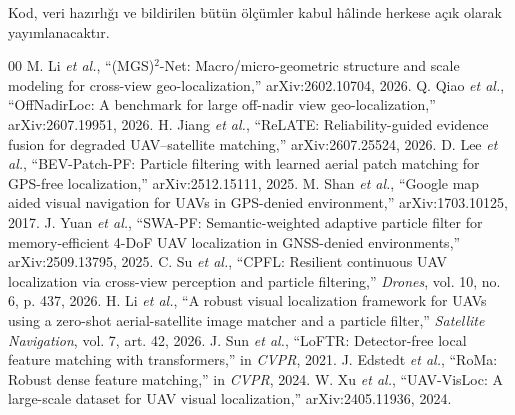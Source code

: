 \documentclass[conference]{IEEEtran}
\begin{document}
Kod, veri hazırlığı ve bildirilen bütün ölçümler kabul hâlinde herkese açık
olarak yayımlanacaktır.

\begin{thebibliography}{00}
 M. Li \textit{et al.}, ``(MGS)$^2$-Net: Macro/micro-geometric
structure and scale modeling for cross-view geo-localization,''
arXiv:2602.10704, 2026.
 Q. Qiao \textit{et al.}, ``OffNadirLoc: A benchmark for large
off-nadir view geo-localization,'' arXiv:2607.19951, 2026.
 H. Jiang \textit{et al.}, ``ReLATE: Reliability-guided evidence
fusion for degraded UAV--satellite matching,'' arXiv:2607.25524, 2026.
 D. Lee \textit{et al.}, ``BEV-Patch-PF: Particle filtering
with learned aerial patch matching for GPS-free localization,''
arXiv:2512.15111, 2025.
 M. Shan \textit{et al.}, ``Google map aided visual navigation for
UAVs in GPS-denied environment,'' arXiv:1703.10125, 2017.
 J. Yuan \textit{et al.}, ``SWA-PF: Semantic-weighted adaptive
particle filter for memory-efficient 4-DoF UAV localization in GNSS-denied
environments,'' arXiv:2509.13795, 2025.
 C. Su \textit{et al.}, ``CPFL: Resilient continuous UAV
localization via cross-view perception and particle filtering,''
\textit{Drones}, vol. 10, no. 6, p. 437, 2026.
 H. Li \textit{et al.}, ``A robust visual localization
framework for UAVs using a zero-shot aerial-satellite image matcher and a
particle filter,'' \textit{Satellite Navigation}, vol. 7, art. 42, 2026.
 J. Sun \textit{et al.}, ``LoFTR: Detector-free local feature
matching with transformers,'' in \textit{CVPR}, 2021.
 J. Edstedt \textit{et al.}, ``RoMa: Robust dense feature
matching,'' in \textit{CVPR}, 2024.
 W. Xu \textit{et al.}, ``UAV-VisLoc: A large-scale dataset
for UAV visual localization,'' arXiv:2405.11936, 2024.
\end{thebibliography}
\end{document}
